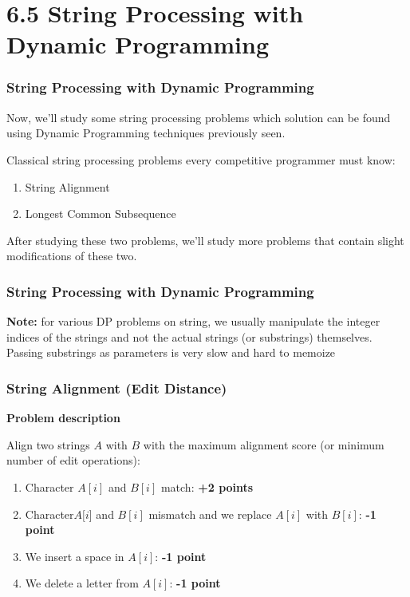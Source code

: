 \documentclass{beamer}
\begin{document}
\section{6.5 String Processing with Dynamic Programming}

\begin{frame}[fragile]
\frametitle{String Processing with Dynamic Programming}

Now, we'll study some string processing problems which solution can be found using Dynamic Programming techniques previously seen. 

\vspace{0.3cm}

Classical string processing problems every competitive programmer must know:
\begin{enumerate}
    \item String Alignment
    \item Longest Common Subsequence
\end{enumerate}

\vspace{0.3cm}

After studying these two problems, we'll study more problems that contain slight modifications of these two. 

\end{frame}

\begin{frame}
\frametitle{String Processing with Dynamic Programming}

\color{blue}\textbf{Note:} for various DP problems on string, we usually manipulate the integer indices of the strings and not the actual strings (or substrings) themselves. Passing substrings as parameters is very slow and hard to memoize \color{black}

\end{frame}


\begin{frame}[fragile]
\frametitle{String Alignment (Edit Distance)}

\color{red}\textbf{Problem description}\color{black}

Align two strings $A$ with $B$ with the maximum alignment score (or minimum number of edit operations):

\begin{enumerate}
    \item Character $A[i]$ and $B[i]$ match: \textbf{+2 points}
    \item Character$ A[i$] and $B[i]$ mismatch and we replace $A[i]$ with $B[i]$: \textbf{-1 point}
    \item We insert a space in $A[i]$: \textbf{-1 point}
    \item We delete a letter from $A[i]$: \textbf{-1 point}
\end{enumerate}

\end{frame}
\end{document}
